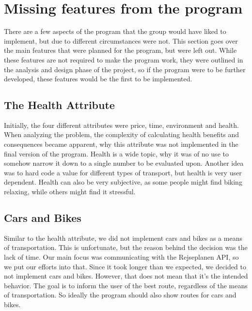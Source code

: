 \section{Missing features from the program}\label{sec:improvements}

There are a few aspects of the program that the group would have liked to implement, but due to different circumstances
were not.
This section goes over the main features that were planned for the program, but were left out.
While these features are not required to make the program work, they were outlined in the analysis and design phase of
the project, so if the program were to be further developed, these features would be the first to be implemented.

\subsection{The Health Attribute}\label{subsec:health-attribute}

Initially, the four different attributes were price, time, environment and health.
When analyzing the problem, the complexity of calculating health benefits and consequences became apparent,
why this attribute was not implemented in the final version of the program.
Health is a wide topic, why it was of no use to somehow narrow it down to a single number to be evaluated upon.
Another idea was to hard code a value for different types of transport, but health is very user dependent.
Health can also be very subjective, as some people might find biking relaxing, while others might find it stressful.

\subsection{Cars and Bikes}\label{subsec:cars-bikes-walking}

Similar to the health attribute, we did not implement cars and bikes as a means of transportation.
This is unfortunate, but the reason behind the decision was the lack of time.
Our main focus was communicating with the Rejseplanen API, so we put our efforts into that.
Since it took longer than we expected, we decided to not implement cars and bikes.
However, that does not mean that it's the intended behavior.
The goal is to inform the user of the best route, regardless of the means of transportation.
So ideally the program should also show routes for cars and bikes.

